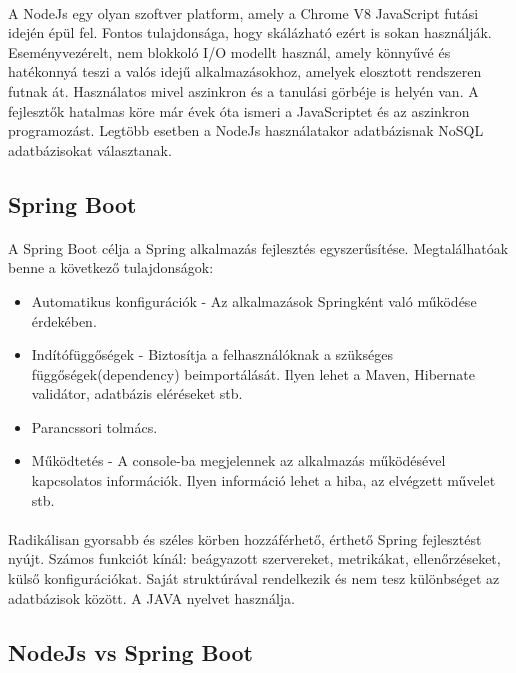 	\paragraph{} 
	A NodeJs \cite{js2016node} egy olyan szoftver platform, amely a Chrome V8 JavaScript futási idején épül fel. Fontos tulajdonsága, hogy skálázható ezért is sokan használják. Eseményvezérelt, nem blokkoló I/O modellt használ, amely könnyűvé és hatékonnyá teszi a valós idejű alkalmazásokhoz, amelyek elosztott rendszeren futnak át. Használatos mivel aszinkron és a tanulási görbéje is helyén van. A fejlesztők hatalmas köre már évek óta ismeri a JavaScriptet és az aszinkron programozást. Legtöbb esetben a NodeJs használatakor adatbázisnak NoSQL adatbázisokat választanak.
	
	\subsection{Spring Boot}
	\paragraph{}
	A Spring Boot \cite{jovanovic2017java} célja a Spring alkalmazás fejlesztés egyszerűsítése. Megtalálhatóak benne a következő tulajdonságok:
	\begin{itemize}
		\item Automatikus konfigurációk - Az alkalmazások Springként való működése érdekében.
		\item Indítófüggőségek - Biztosítja a felhasználóknak a szükséges függőségek(dependency) beimportálását. Ilyen lehet a Maven, Hibernate validátor, adatbázis eléréseket stb.
		\item Parancssori tolmács.
		\item Működtetés - A console-ba megjelennek az alkalmazás működésével kapcsolatos információk. Ilyen információ lehet a hiba, az elvégzett művelet stb.
	\end{itemize}
	
	\paragraph{}
	Radikálisan gyorsabb és széles körben hozzáférhető, érthető Spring fejlesztést nyújt. Számos funkciót kínál: beágyazott szervereket, metrikákat, ellenőrzéseket, külső konfigurációkat. Saját struktúrával rendelkezik és nem tesz különbséget az adatbázisok között. A JAVA nyelvet használja.
	
	\subsection{NodeJs vs Spring Boot}
